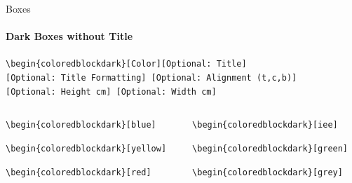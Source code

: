 \documentclass[aspectratio=169]{beamer}
\begin{document}
\begin{frame}{Boxes}
    \framesubtitle{Dark Boxes without Title}

    \begin{coloredblock}[grey]
        \footnotesize\centering\texttt{\textbackslash begin\{coloredblockdark\}[Color][Optional:~Title][Optional:~Title~Formatting] [Optional:~Alignment (t,c,b)][Optional:~Height~cm] [Optional:~Width~cm]}
    \end{coloredblock}

    \vspace{-1cm}
    \begin{columns}
        \begin{column}{0.49\textwidth}

            \begin{coloredblockdark}[blue]
                \footnotesize\texttt{\textbackslash begin\{coloredblockdark\}[blue]}\strut
            \end{coloredblockdark}
    
            \begin{coloredblockdark}[yellow]
                \footnotesize\texttt{\textbackslash begin\{coloredblockdark\}[yellow]}\strut
            \end{coloredblockdark}
    
            \begin{coloredblockdark}[red]
                \footnotesize\texttt{\textbackslash begin\{coloredblockdark\}[red]}\strut
            \end{coloredblockdark}

        \end{column}
        \begin{column}{0.49\textwidth}
        
            \begin{coloredblockdark}[iee]
                \footnotesize\texttt{\textbackslash begin\{coloredblockdark\}[iee]}\strut
            \end{coloredblockdark}
    
            \begin{coloredblockdark}[green]
                \footnotesize\texttt{\textbackslash begin\{coloredblockdark\}[green]}\strut
            \end{coloredblockdark}
    
            \begin{coloredblockdark}[grey]
                \footnotesize\texttt{\textbackslash begin\{coloredblockdark\}[grey]}\strut
            \end{coloredblockdark}
        

\end{column}
\end{columns}
\end{frame}
\end{document}
